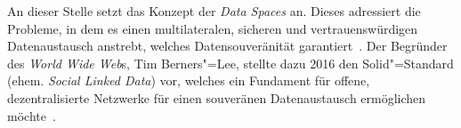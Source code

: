 An dieser Stelle setzt das Konzept der \emph{Data Spaces} an. Dieses adressiert die Probleme, in dem es einen multilateralen, sicheren und vertrauenswürdigen Datenaustausch anstrebt, welches Datensouveränität garantiert~\cite{mollerIndustrialDataEcosystems2024}.
Der Begründer des \emph{World Wide Web}s, Tim Berners"=Lee, stellte dazu 2016 den Solid"=Standard (ehem. \emph{Social Linked Data}) vor, welches ein Fundament für offene, dezentralisierte Netzwerke für einen souveränen Datenaustausch ermöglichen möchte~\cite{mecklerWebLinkedData2023}.
